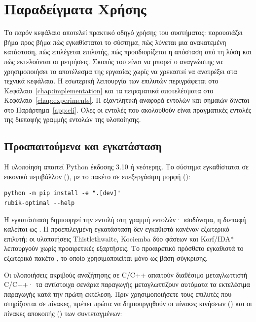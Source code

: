 \chapter{Παραδείγματα Χρήσης}
\label{chap:usage}

Το παρόν κεφάλαιο αποτελεί πρακτικό οδηγό χρήσης του συστήματος: παρουσιάζει βήμα προς βήμα πώς εγκαθίσταται το σύστημα, πώς λύνεται μια ανακατεμένη κατάσταση, πώς επιλέγεται επιλυτής, πώς προσδιορίζεται η απόσταση από τη λύση και πώς εκτελούνται οι μετρήσεις. Σκοπός του είναι να μπορεί ο αναγνώστης να χρησιμοποιήσει το αποτέλεσμα της εργασίας χωρίς να χρειαστεί να ανατρέξει στα τεχνικά κεφάλαια. Η εσωτερική λειτουργία των επιλυτών περιγράφεται στο Κεφάλαιο~\ref{chap:implementation} και τα πειραματικά αποτελέσματα στο Κεφάλαιο~\ref{chap:experiments}. Η εξαντλητική αναφορά εντολών και σημαιών δίνεται στο Παράρτημα~\ref{app:cli}. Όλες οι εντολές που ακολουθούν είναι πραγματικές εντολές της διεπαφής γραμμής εντολών της υλοποίησης.

\section{Προαπαιτούμενα και εγκατάσταση}
\label{sec:usage-install}

Η υλοποίηση απαιτεί Python έκδοσης 3.10 ή νεότερης. Το σύστημα εγκαθίσταται σε εικονικό περιβάλλον (), με το πακέτο σε επεξεργάσιμη μορφή ():

\begin{verbatim}
python -m pip install -e ".[dev]"
rubik-optimal --help
\end{verbatim}

Η εγκατάσταση δημιουργεί την εντολή  στη γραμμή εντολών· ισοδύναμα, η διεπαφή καλείται ως . Η προεπιλεγμένη εγκατάσταση δεν εγκαθιστά κανέναν εξωτερικό επιλυτή: οι υλοποιήσεις Thistlethwaite, Kociemba δύο φάσεων και Korf/IDA* λειτουργούν χωρίς προαιρετικές εξαρτήσεις. Το προαιρετικό πρόσθετο  εγκαθιστά το εξωτερικό πακέτο , το οποίο χρησιμοποιείται μόνο ως βάση σύγκρισης.

Οι υλοποιήσεις ακριβούς αναζήτησης σε C/C++ απαιτούν διαθέσιμο μεταγλωττιστή C/C++· τα αντίστοιχα σενάρια παραγωγής μεταγλωττίζουν αυτόματα τα εκτελέσιμα παραγωγής κατά την πρώτη εκτέλεση. Πριν χρησιμοποιήσετε τους επιλυτές που στηρίζονται σε πίνακες, πρέπει πρώτα να δημιουργηθούν οι πίνακες κινήσεων () και οι πίνακες αποκοπής () των συντεταγμένων:

